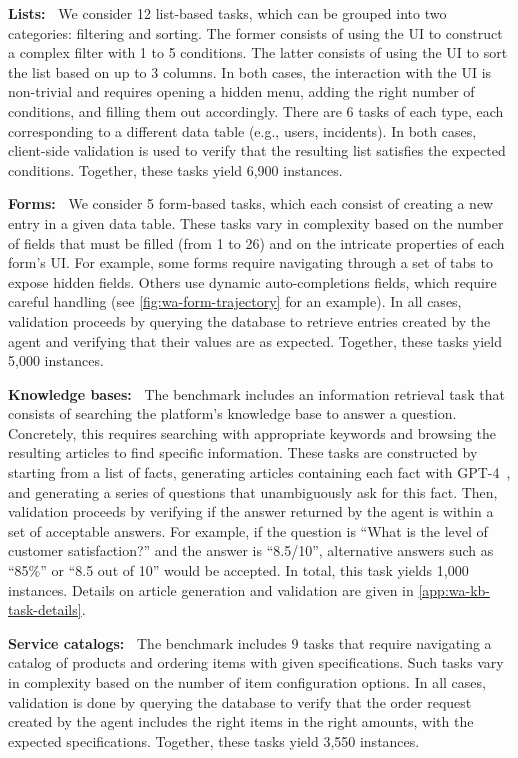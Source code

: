 \documentclass{article}
\theoremstyle{plain}
\theoremstyle{definition}
\theoremstyle{remark}
\newcommand{\paragraphtight}[1]{\textbf{#1~}}
\begin{document}
\paragraphtight{Lists:} We consider 12 list-based tasks, which can be grouped into two categories: filtering and sorting. The former consists of using the UI to construct a complex filter with 1 to 5 conditions. The latter consists of using the UI to sort the list based on up to 3 columns. In both cases, the interaction with the UI is non-trivial and requires opening a hidden menu, adding the right number of conditions, and filling them out accordingly. There are 6 tasks of each type, each corresponding to a different data table (e.g., users, incidents). In both cases, client-side validation is used to verify that the resulting list satisfies the expected conditions. Together, these tasks yield 6,900 instances.

\paragraphtight{Forms:} We consider 5 form-based tasks, which each consist of creating a new entry in a given data table. These tasks vary in complexity based on the number of fields that must be filled (from 1 to 26) and on the intricate properties of each form's UI. For example, some forms require navigating through a set of tabs to expose hidden fields. Others use dynamic auto-completions fields, which require careful handling (see \cref{fig:wa-form-trajectory} for an example). In all cases, validation proceeds by querying the database to retrieve entries created by the agent and verifying that their values are as expected. Together, these tasks yield 5,000 instances.

\paragraphtight{Knowledge bases:} The benchmark includes an information retrieval task that consists of searching the platform's knowledge base to answer a question. Concretely, this requires searching with appropriate keywords and browsing the resulting articles to find specific information. These tasks are constructed by starting from a list of facts, generating articles containing each fact with GPT-4~\citep{OpenAI2023GPT4TR}, and generating a series of questions that unambiguously ask for this fact. Then, validation proceeds by verifying if the answer returned by the agent is within a set of acceptable answers. For example, if the question is ``What is the level of customer satisfaction?'' and the answer is ``8.5/10'', alternative answers such as ``85\%'' or ``8.5 out of 10'' would be accepted. In total, this task yields 1,000 instances. Details on article generation and validation are given in \cref{app:wa-kb-task-details}.

\paragraphtight{Service catalogs:} The benchmark includes 9 tasks that require navigating a catalog of products and ordering items with given specifications. Such tasks vary in complexity based on the number of item configuration options. In all cases, validation is done by querying the database to verify that the order request created by the agent includes the right items in the right amounts, with the expected specifications. Together, these tasks yield 3,550 instances.
\end{document}
